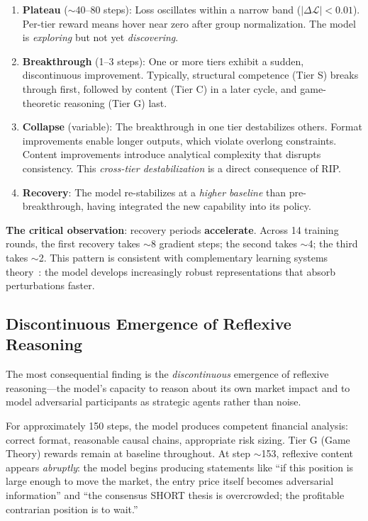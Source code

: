 \documentclass[sigconf]{acmart}
\begin{document}
\begin{enumerate}
    \item \textbf{Plateau} ($\sim$40--80 steps): Loss oscillates within a narrow band ($|\Delta\mathcal{L}| < 0.01$). Per-tier reward means hover near zero after group normalization. The model is \textit{exploring} but not yet \textit{discovering}.
    
    \item \textbf{Breakthrough} (1--3 steps): One or more tiers exhibit a sudden, discontinuous improvement. Typically, structural competence (Tier S) breaks through first, followed by content (Tier C) in a later cycle, and game-theoretic reasoning (Tier G) last.
    
    \item \textbf{Collapse} (variable): The breakthrough in one tier destabilizes others. Format improvements enable longer outputs, which violate overlong constraints. Content improvements introduce analytical complexity that disrupts consistency. This \textit{cross-tier destabilization} is a direct consequence of RIP.
    
    \item \textbf{Recovery}: The model re-stabilizes at a \textit{higher baseline} than pre-breakthrough, having integrated the new capability into its policy.
\end{enumerate}

\textbf{The critical observation}: recovery periods \textbf{accelerate}. Across 14 training rounds, the first recovery takes $\sim$8 gradient steps; the second takes $\sim$4; the third takes $\sim$2. This pattern is consistent with complementary learning systems theory~\cite{mcclelland1995cls}: the model develops increasingly robust representations that absorb perturbations faster.

\subsection{Discontinuous Emergence of Reflexive Reasoning}

The most consequential finding is the \textit{discontinuous} emergence of reflexive reasoning---the model's capacity to reason about its own market impact and to model adversarial participants as strategic agents rather than noise.

For approximately 150 steps, the model produces competent financial analysis: correct format, reasonable causal chains, appropriate risk sizing. Tier G (Game Theory) rewards remain at baseline throughout. At step $\sim$153, reflexive content appears \textit{abruptly}: the model begins producing statements like ``if this position is large enough to move the market, the entry price itself becomes adversarial information'' and ``the consensus SHORT thesis is overcrowded; the profitable contrarian position is to wait.''
\end{document}
